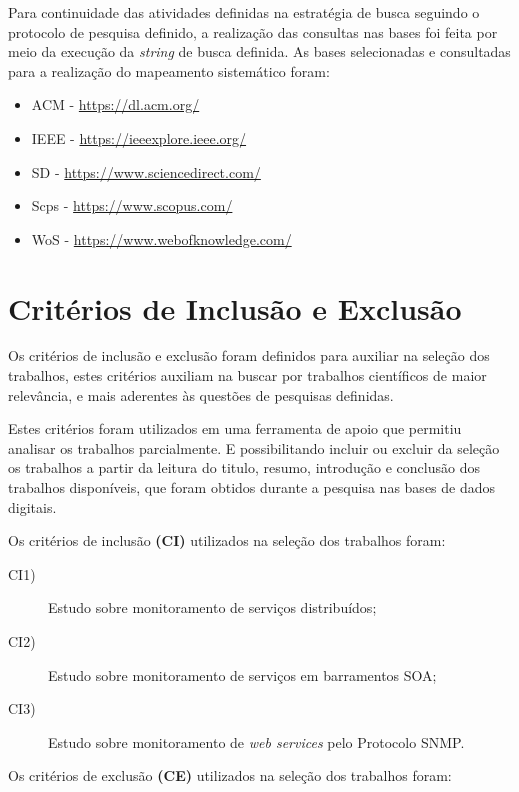 Para continuidade das atividades definidas na estratégia de busca seguindo o protocolo de pesquisa definido, a realização das consultas nas bases foi feita por meio da execução da \textit{string} de busca definida. As bases selecionadas e consultadas para a realização do mapeamento sistemático foram:
\begin{itemize}
\item \acrlong{ACM} - \url{https://dl.acm.org/}
\item \acrlong{IEEE} - \url{https://ieeexplore.ieee.org/}
\item \acrlong{SD} - \url{https://www.sciencedirect.com/}
\item \acrlong{Scps} - \url{https://www.scopus.com/}
\item \acrlong{WoS} - \url{https://www.webofknowledge.com/}
\end{itemize}


\section{Critérios de Inclusão e Exclusão}
\label{sec:cIncExc}
Os critérios de inclusão e exclusão foram definidos para auxiliar na seleção dos trabalhos, estes critérios auxiliam na buscar por trabalhos científicos de maior relevância, e mais aderentes às questões de pesquisas definidas. 

Estes critérios foram utilizados em uma ferramenta de apoio que permitiu analisar os trabalhos parcialmente. E possibilitando incluir ou excluir da seleção os trabalhos a partir da leitura do titulo, resumo, introdução e conclusão dos trabalhos disponíveis, que foram obtidos durante a pesquisa nas bases de dados digitais.    

Os critérios de inclusão \textbf{(CI)} utilizados na seleção dos trabalhos foram:

\begin{description}

\item[CI1)] Estudo sobre monitoramento de serviços distribuídos;
\item[CI2)] Estudo sobre monitoramento de serviços em barramentos \acrshort{SOA};
\item[CI3)] Estudo sobre monitoramento de \textit{web services} pelo Protocolo \acrshort{SNMP}.
\end{description}

Os critérios de exclusão \textbf{(CE)} utilizados na seleção dos trabalhos foram:

